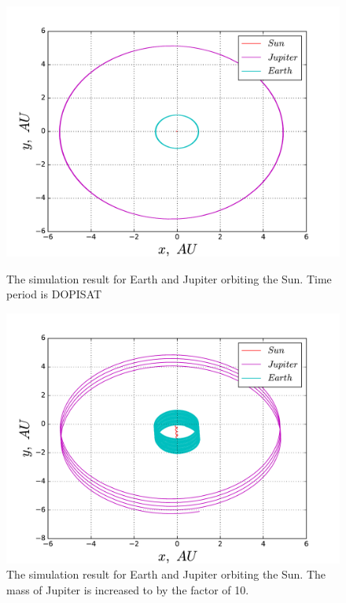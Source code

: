 \documentclass[10pt]{article}
\begin{document}
\newpage
\begin{figure}[ht]
  \begin{center}
    \includegraphics[scale=0.5]{3body_orig_jup}
    \caption {The simulation result for Earth and Jupiter orbiting the Sun. Time period is DOPISAT}
    \label{fig:3body_orig_jup}
  \end{center}
\vspace*{\floatsep}
  \begin{center}
    \includegraphics[scale=0.5]{3body_10x_jup}
    \caption {The simulation result for Earth and Jupiter orbiting the Sun. The mass of Jupiter is increased to by the factor of 10.}
    \label{fig:3body_10x_jup}
  \end{center}
\end{figure}
\clearpage
\end{document}
